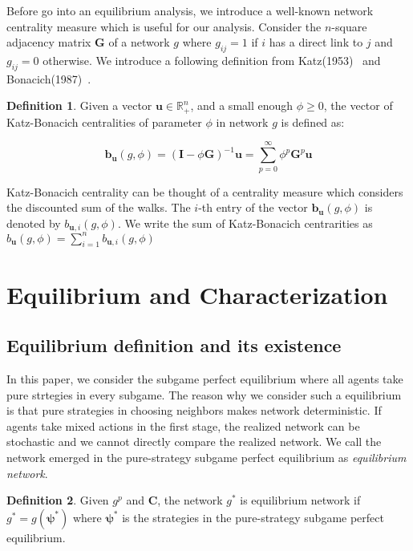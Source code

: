 \documentclass[12pt]{article}
\theoremstyle{definition}
\newtheorem{definition}{Definition}
\begin{document}
Before go into an equilibrium analysis, we introduce a well-known network centrality measure which is useful for our analysis.
Consider the $n$-square adjacency matrix $\bm{G}$ of a network $g$ where $g_{ij} = 1$ if $i$ has a direct link to $j$ and $g_{ij} = 0$ otherwise.
We introduce a following definition from Katz(1953)~\cite{katz} and Bonacich(1987)~\cite{bonacich}.

\begin{definition}
Given a vector $\bm{u} \in \mathbb{R}_+^n$, and a small enough $\phi \ge 0$, the vector of Katz-Bonacich centralities of parameter $\phi$ in network $g$ is defined as:

\[ \bm{b}_{\bm{u}}(g, \phi) = {(\bm{I} - \phi \bm{G})}^{-1} \bm{u} = \sum_{p=0}^{\infty} \phi^p \bm{G}^p \bm{u} \]

\end{definition}

Katz-Bonacich centrality can be thought of a centrality measure which considers the discounted sum of the walks.
The $i$-th entry of the vector $\bm{b}_{\bm{u}}(g, \phi)$ is denoted by $b_{\bm{u}, i}(g, \phi)$.
We write the sum of Katz-Bonacich centrarities as $b_{\bm{u}}(g, \phi) = \sum_{i=1}^n b_{\bm{u}, i}(g, \phi)$


\section{Equilibrium and Characterization}


\subsection{Equilibrium definition and its existence}

In this paper, we consider the subgame perfect equilibrium where all agents take pure strtegies in every subgame.
The reason why we consider such a equilibrium is that pure strategies in choosing neighbors makes network deterministic.
If agents take mixed actions in the first stage, the realized network can be stochastic and we cannot directly compare the realized network.
We call the network emerged in the pure-strategy subgame perfect equilibrium as {\it{equilibrium network}}.

\begin{definition}
Given $g^p$ and $\bm{C}$, the network $g^*$ is equilibrium network if $g^* = g(\bm{\psi}^*)$ where $\bm{\psi}^*$ is the strategies in the pure-strategy subgame perfect equilibrium.
\end{definition}
\end{document}
